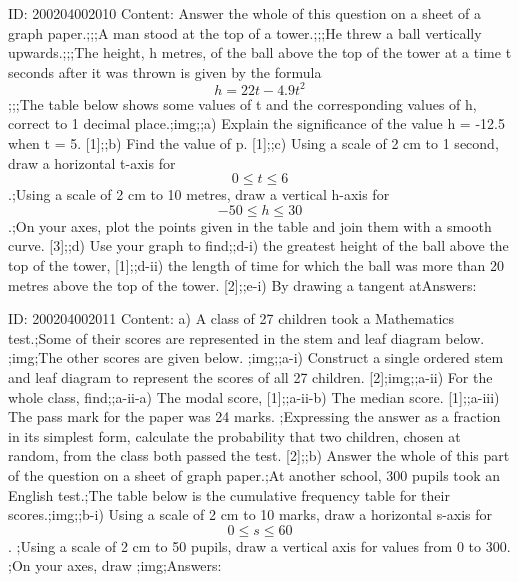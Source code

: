 \documentclass{article}
\begin{document}
ID: 200204002010
Content:
Answer the whole of this question on a sheet of a graph paper.;;;A man stood at the top of a tower.;;;He threw a ball vertically upwards.;;;The height, h metres, of the ball above the top of the tower at a time t seconds after it was thrown is given by the formula $$h = 22t - 4.9t^2$$;;;The table below shows some values of t and the corresponding values of h, correct to 1 decimal place.;img;;a) Explain the significance of the value h = -12.5 when t = 5.   [1];;b) Find the value of p.   [1];;c) Using a scale of 2 cm to 1 second, draw a horizontal t-axis for $$0 \leq t \leq 6$$.;Using a scale of 2 cm to 10 metres, draw a vertical h-axis for $$-50 \leq h \leq 30$$.;On your axes, plot the points given in the table and join them with a smooth curve.   [3];;d) Use your graph to find;;d-i) the greatest height of the ball above the top of the tower,   [1];;d-ii) the length of time for which the ball was more than 20 metres above the top of the tower.   [2];;e-i) By drawing a tangent atAnswers:

ID: 200204002011
Content:
a) A class of 27 children took a Mathematics test.;Some of their scores are represented in the stem and leaf diagram below. ;img;The other scores are given below. ;img;;a-i) Construct a single ordered stem and leaf diagram to represent the scores of all 27 children.   [2];img;;a-ii) For the whole class, find;;a-ii-a) The modal score,   [1];;a-ii-b) The median score.   [1];;a-iii) The pass mark for the paper was 24 marks. ;Expressing the answer as a fraction in its simplest form, calculate the probability that two children, chosen at random, from the class both passed the test.   [2];;b) Answer the whole of this part of the question on a sheet of graph paper.;At another school, 300 pupils took an English test.;The table below is the cumulative frequency table for their scores.;img;;b-i) Using a scale of 2 cm to 10 marks, draw a horizontal s-axis for $$0 \leq s \leq 60$$. ;Using a scale of 2 cm to 50 pupils, draw a vertical axis for values from 0 to 300. ;On your axes, draw ;img;Answers:
\end{document}
